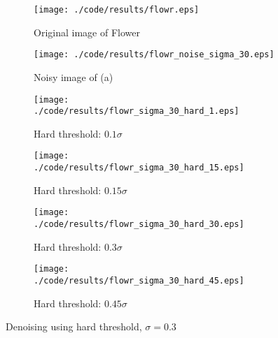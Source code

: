 \documentclass[journal,comsoc]{IEEEtran}
\begin{document}
\begin{figure}[!hbt]
  \centering
  \begin{subfigure}{.25\textwidth}
    \centering
    \texttt{[image: ./code/results/flowr.eps]}
    \caption{Original image of Flower}
    \label{subfig:original-image-of-flower}
  \end{subfigure}%
  \begin{subfigure}{.25\textwidth}
    \centering
    \texttt{[image: ./code/results/flowr\_noise\_sigma\_30.eps]}
    \caption{Noisy image of (a)}
    \label{subfig:flower-sigma-10-noisy-image-of-a}
  \end{subfigure}

  \begin{subfigure}{0.25\textwidth}
    \centering{}
    \texttt{[image: ./code/results/flowr\_sigma\_30\_hard\_1.eps]}
    \caption{Hard threshold: $0.1\sigma$}
  \end{subfigure}%
  \begin{subfigure}{.25\textwidth}
    \centering{}
    \texttt{[image: ./code/results/flowr\_sigma\_30\_hard\_15.eps]}
    \caption{Hard threshold: $0.15\sigma$}
  \end{subfigure}

  \begin{subfigure}{0.25\textwidth}
    \centering{}
    \texttt{[image: ./code/results/flowr\_sigma\_30\_hard\_30.eps]}
    \caption{Hard threshold: $0.3\sigma$}
  \end{subfigure}%
  \begin{subfigure}{.25\textwidth}
    \centering{}
    \texttt{[image: ./code/results/flowr\_sigma\_30\_hard\_45.eps]}
    \caption{Hard threshold: $0.45\sigma$}
  \end{subfigure}
  
  \caption{Denoising using hard threshold, $\sigma=0.3$}
  \label{fig:flower-sigma-30-hard-threshold}
\end{figure}
\end{document}
